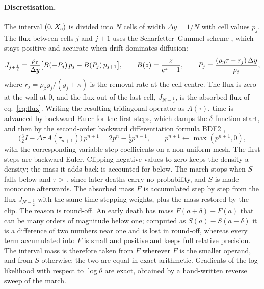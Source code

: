 \paragraph{Discretisation.} The interval $(0,X_c)$ is divided into $N$ cells of width $\Delta y=1/N$ with cell values
$p_j$. The flux between cells $j$ and $j+1$ uses the Scharfetter--Gummel scheme \citep{scharfetter1969large}, which
stays positive and accurate when drift dominates diffusion:
\begin{equation}\label{eq:sg}
  J_{j+\frac12}=\frac{\rho_\varepsilon}{\Delta y}\bigl[B(-P_j)\,p_j-B(P_j)\,p_{j+1}\bigr],\qquad
  B(z)=\frac{z}{e^{z}-1},\qquad P_j=\frac{(\rho_\eta\tau-r_j)\,\Delta y}{\rho_\varepsilon},
\end{equation}
where $r_j=\rho_\beta y_j/(y_j+\kappa)$ is the removal rate at the cell centre. The flux is zero at the wall at $0$, and
the flux out of the last cell, $J_{N-\frac12}$, is the absorbed flux of eq.~\eqref{eq:flux}. Writing the resulting
tridiagonal operator as $A(\tau)$, time is advanced by backward Euler for the first steps, which damps the
$\delta$-function start, and then by the second-order backward differentiation formula BDF2 \citep{hairer1996solving},
\begin{equation}\label{eq:bdf2}
  \bigl(\tfrac32 I-\Delta\tau\,A(\tau_{n+1})\bigr)\,p^{n+1}=2p^{n}-\tfrac12 p^{n-1},\qquad p^{n+1}\leftarrow\max(p^{n+1},0),
\end{equation}
with the corresponding variable-step coefficients on a non-uniform mesh. The first  steps are backward Euler.
Clipping negative values to zero keeps the density a density; the mass it adds back is accounted for below. The march
stops when $S$ falls below  and $\tau>$\,, since later deaths carry no probability, and $S$ is made
monotone afterwards. The absorbed mass $F$ is accumulated step by step from the flux $J_{N-\frac12}$ with the same
time-stepping weights, plus the mass restored by the clip. The reason is round-off. An early death has mass
$F(a+\delta)-F(a)$ that can be many orders of magnitude below one; computed as $S(a)-S(a+\delta)$ it is a difference of two
numbers near one and is lost in round-off, whereas every term accumulated into $F$ is small and positive and keeps full
relative precision. The interval mass is therefore taken from $F$ wherever $F$ is the smaller operand, and from $S$
otherwise; the two are equal in exact arithmetic. Gradients of the log-likelihood with respect to $\log\theta$ are
exact, obtained by a hand-written reverse sweep of the march.

